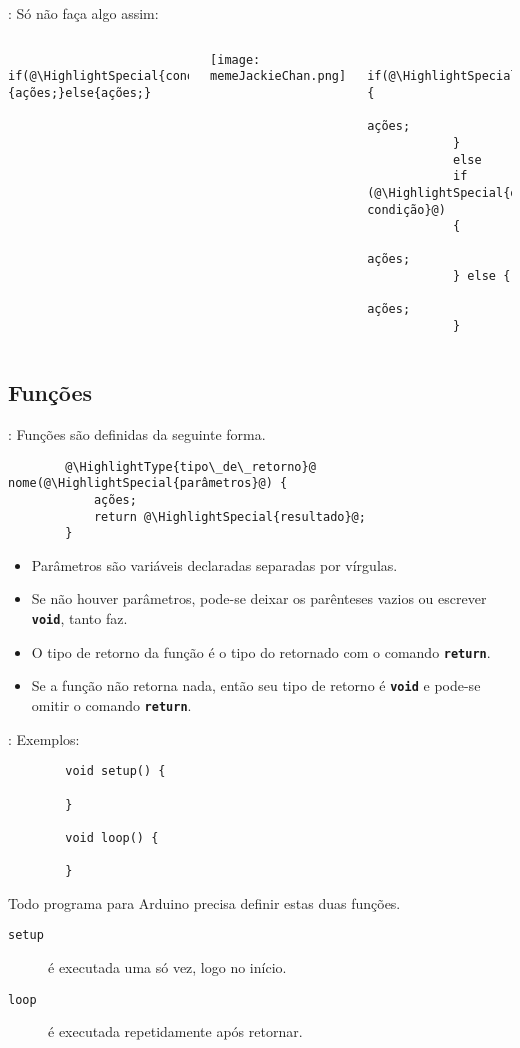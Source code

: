 \begin{frame}[fragile]{\insertsection: \insertsubsection}
	Só não faça algo assim:
	\begin{columns}[t]
		\begin{verbatim}
			if(@\HighlightSpecial{condição}@){ações;}else{ações;}
		\end{verbatim}
		\texttt{[image: memeJackieChan.png]}

		\begin{verbatim}
			if(@\HighlightSpecial{condição}@) {
				ações;
			}
			else
			if (@\HighlightSpecial{outra condição}@)
			{
				ações;
			} else {
				ações;
			}
		\end{verbatim}
	\end{columns}
\end{frame}


\subsection{Funções}


\begin{frame}[fragile]{\insertsection: \insertsubsection}
	Funções são definidas da seguinte forma.
	\begin{verbatim}
		@\HighlightType{tipo\_de\_retorno}@ nome(@\HighlightSpecial{parâmetros}@) {
			ações;
			return @\HighlightSpecial{resultado}@;
		}
	\end{verbatim}

	\begin{itemize}
		\item Parâmetros são variáveis declaradas separadas por vírgulas.
		\item Se não houver parâmetros, pode-se deixar os parênteses vazios ou escrever \texttt{\textbf{void}}, tanto faz.
		\item O tipo de retorno da função é o tipo do  retornado com o comando \texttt{\textbf{return}}.
		\item Se a função não retorna nada, então seu tipo de retorno é \texttt{\textbf{void}} e pode-se omitir o comando \texttt{\textbf{return}}.
	\end{itemize}
\end{frame}


\begin{frame}[fragile]{\insertsection: \insertsubsection}
	Exemplos:
	\begin{verbatim}
		void setup() {

		}

		void loop() {

		}
	\end{verbatim}

	Todo programa para Arduino precisa definir estas duas funções.
	\begin{description}
		\item[\texttt{setup}] é executada uma só vez, logo no início.
		\item[\texttt{loop}] é executada repetidamente após \texttt{} retornar.
	\end{description}
\end{frame}


